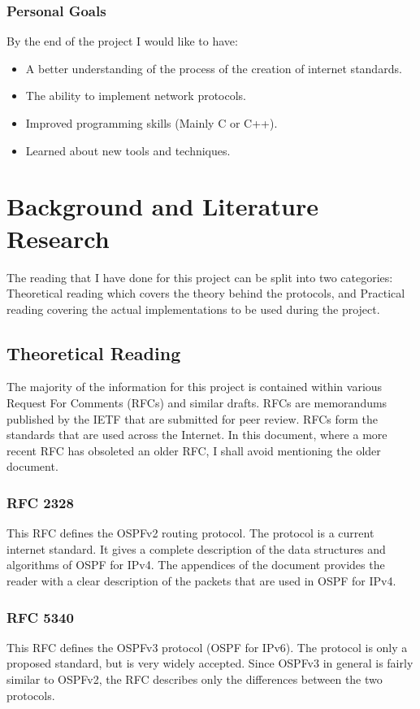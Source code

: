 \documentclass[12pt]{report}
\begin{document}
\subsection{Personal Goals}
By the end of the project I would like to have:

\begin{itemize}
	\item A better understanding of the process of the creation of internet
	standards.
	\item The ability to implement network protocols. 
	\item Improved programming skills (Mainly C or C++).
	\item Learned about new tools and techniques.
\end{itemize}

\chapter{Background and Literature Research}
The reading that I have done for this project can be split into two categories:
Theoretical reading which covers the theory behind the protocols, and Practical 
reading covering the actual implementations to be used during the project.

\section{Theoretical Reading}
The majority of the information for this project is contained within various
Request For Comments (RFCs)  and similar
drafts. RFCs are memorandums published by the IETF that are submitted for peer
review. RFCs form the standards that are used across the Internet. In this
document, where a more recent RFC has obsoleted an older RFC, I shall avoid
mentioning the older document. 

\subsection{RFC 2328} 
This RFC defines the OSPFv2 routing protocol\cite{rfc2328}. The protocol is a
current internet standard. It gives a complete description of the data
structures and algorithms of OSPF for IPv4. The appendices of the document
provides the reader with a clear description of the packets that are used in
OSPF for IPv4.

\subsection{RFC 5340}
This RFC defines the OSPFv3 protocol (OSPF for IPv6)\cite{rfc540}. The protocol
is only a proposed standard, but is very widely accepted.  Since OSPFv3 in
general is fairly similar to OSPFv2, the RFC describes only the differences
between the two protocols. 
\end{document}
